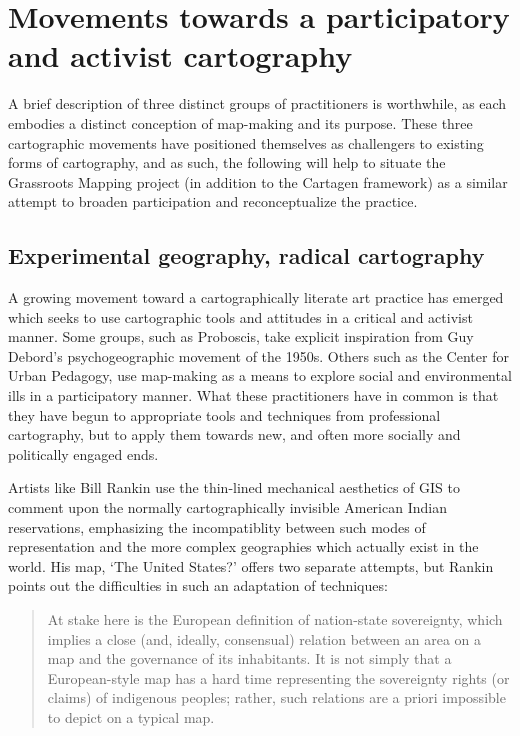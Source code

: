 \documentclass[11pt]{report}
\begin{document}
\chapter{Movements towards a participatory and activist cartography}

A brief description of three distinct groups of practitioners is worthwhile, as each embodies a distinct conception of map-making and its purpose. These three cartographic movements have positioned themselves as challengers to existing forms of cartography, and as such, the following will help to situate the Grassroots Mapping project (in addition to the Cartagen framework) as a similar attempt to broaden participation and reconceptualize the practice. 

\section{Experimental geography, radical cartography}

A growing movement toward a cartographically literate art practice has emerged which seeks to use cartographic tools and attitudes in a critical and activist manner. Some groups, such as Proboscis, take explicit inspiration from Guy Debord's psychogeographic movement of the 1950s. Others such as the Center for Urban Pedagogy, use map-making as a means to explore social and environmental ills in a participatory manner. What these practitioners have in common is that they have begun to appropriate tools and techniques from professional cartography, but to apply them towards new, and often more socially and politically engaged ends. 

Artists like Bill Rankin use the thin-lined mechanical aesthetics of GIS to comment upon the normally cartographically invisible American Indian reservations, emphasizing the incompatiblity between such modes of representation and the more complex geographies which actually exist in the world. His map, `The United States?' offers two separate attempts, but Rankin points out the difficulties in such an adaptation of techniques:

\begin{quote}
At stake here is the European definition of nation-state sovereignty, which implies a close (and, ideally, consensual) relation between an area on a map and the governance of its inhabitants. It is not simply that a European-style map has a hard time representing the sovereignty rights (or claims) of indigenous peoples; rather, such relations are a priori impossible to depict on a typical map. \cite{rankin2003reservations}
\end{quote}
\end{document}
